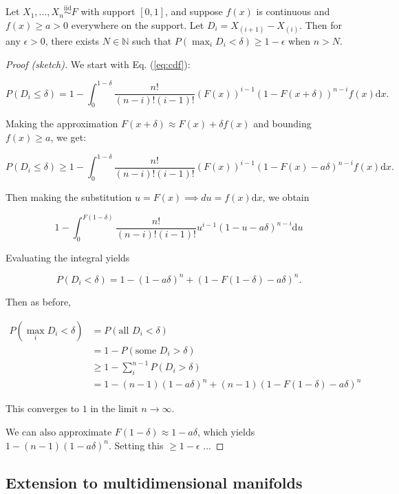 \documentclass[
  11pt,
]{article}
\begin{document}
\begin{theorem}
\label{thm:generalized}
Let $X_1, ..., X_n \stackrel{\mathrm{iid}}{\sim}F$ with support $[0, 1]$, and suppose $f(x)$ is continuous and $f(x) \geq a > 0$ everywhere on the support. 
Let $D_i = X_{(i+1)} - X_{(i)}$. 
Then for any $\epsilon > 0$, there exists $N \in \mathbb{N}$ such that $P(\max_i D_i < \delta) \geq 1 - \epsilon$ when $n > N$.
\end{theorem}

\begin{proof}[Proof (sketch)]
We start with Eq. (\ref{eq:cdf}):

$$P(D_i \leq \delta) = 1 - \int_0^{1-\delta} \frac{n!}{(n-i)! (i-1)!} (F(x))^{i-1} (1 - F(x + \delta))^{n-i} f(x) \mathrm{d}x.$$

Making the approximation $F(x+\delta) \approx F(x) + \delta f(x)$ 
and bounding $f(x) \geq a$, we get:

$$P(D_i \leq \delta) \geq 1 - \int_0^{1-\delta} \frac{n!}{(n-i)! (i-1)!} (F(x))^{i-1} (1 - F(x) - a \delta)^{n-i} f(x) \mathrm{d}x.$$

Then making the substitution $u = F(x) \implies du = f(x) \mathrm{d}x$, we obtain 

$$1 - \int_0^{F(1-\delta)} \frac{n!}{(n-i)! (i-1)!} u^{i-1} (1 - u - a \delta)^{n-i} \mathrm{d}u$$

Evaluating the integral yields

$$P(D_i < \delta) = 1 - (1 - a \delta)^n + (1 - F(1-\delta) - a \delta)^n.$$

Then as before,

$$
\begin{aligned}
P(\max_i D_i < \delta) & = P(\text{all } D_i < \delta) \\
& = 1 - P(\text{some } D_i > \delta) \\
& \geq 1 - \sum_i^{n-1} P(D_i > \delta) \\
& = 1 - (n - 1) (1 - a \delta)^n + (n - 1) (1 - F(1 - \delta) - a \delta)^n
\end{aligned}
$$

This converges to $1$ in the limit $n \to \infty$.

We can also approximate $F(1 - \delta) \approx 1 - a \delta$, which yields 
$1 - (n - 1) (1 - a \delta)^n$. Setting this $\geq 1 - \epsilon$ ...
\end{proof}

\hypertarget{extension-to-multidimensional-manifolds}{%
\subsection{Extension to multidimensional
manifolds}\label{extension-to-multidimensional-manifolds}}
\end{document}
